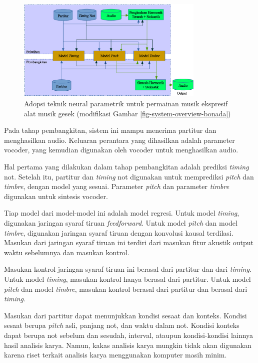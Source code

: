 \begin{figure}[h]
    \centering
    \includegraphics[width=0.8\textwidth]{resources/system-overview.eps}
    \caption{Adopsi teknik neural parametrik untuk permainan musik ekspresif alat musik gesek (modifikasi Gambar \ref{fig-system-overview-bonada})}\label{fig-system-overview}
\end{figure}

Pada tahap pembangkitan, sistem ini mampu menerima partitur dan menghasilkan audio. Keluaran perantara yang dihasilkan adalah parameter vocoder, yang kemudian digunakan oleh vocoder untuk menghasilkan audio.

Hal pertama yang dilakukan dalam tahap pembangkitan adalah prediksi \textit{timing} not. Setelah itu, partitur dan \textit{timing} not digunakan untuk memprediksi \textit{pitch} dan \textit{timbre}, dengan model yang sesuai. Parameter \textit{pitch} dan parameter \textit{timbre} digunakan untuk sintesis vocoder.

Tiap model dari model-model ini adalah model regresi. Untuk model \textit{timing}, digunakan jaringan syaraf tiruan \textit{feedforward}. Untuk model \textit{pitch} dan model \textit{timbre}, digunakan jaringan syaraf tiruan dengan konvolusi kausal terdilasi. Masukan dari jaringan syaraf tiruan ini terdiri dari masukan fitur akustik output waktu sebelumnya dan masukan kontrol.

Masukan kontrol jaringan syaraf tiruan ini berasal dari partitur dan dari \textit{timing}. Untuk model \textit{timing}, masukan kontrol hanya berasal dari partitur. Untuk model \textit{pitch} dan model \textit{timbre}, masukan kontrol berasal dari partitur dan berasal dari \textit{timing}.

Masukan dari partitur dapat menunjukkan kondisi sesaat dan konteks. Kondisi sesaat berupa \textit{pitch} asli, panjang not, dan waktu dalam not. Kondisi konteks dapat berupa not sebelum dan sesudah, interval, ataupun kondisi-kondisi lainnya hasil analisis karya. Namun, kakas analisis karya mungkin tidak akan digunakan karena riset terkait analisis karya menggunakan komputer masih minim.

